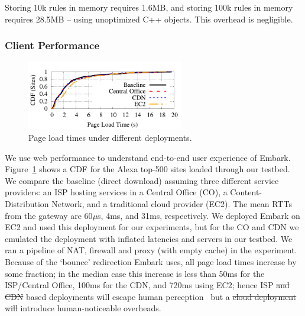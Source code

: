 \documentclass[letterpaper,twocolumn,10pt]{article}
\newcommand{\sys}{Embark\xspace} %
\providecommand{\DIFaddtex}[1]{{\protect\color{blue}\uwave{#1}}} %
\providecommand{\DIFdeltex}[1]{{\protect\color{red}\sout{#1}}}                      %
\providecommand{\DIFaddbegin}{} %
\providecommand{\DIFaddend}{} %
\providecommand{\DIFdelbegin}{} %
\providecommand{\DIFdelend}{} %
\providecommand{\DIFadd}[1]{\texorpdfstring{\DIFaddtex{#1}}{#1}} %
\providecommand{\DIFdel}[1]{\texorpdfstring{\DIFdeltex{#1}}{}} %
\begin{document}
\DIFdelbegin %
\DIFdelend \DIFaddbegin {}
\DIFaddend Storing 10k rules in memory requires 1.6MB, and storing 100k rules in memory requires 28.5MB -- using unoptimized C++ objects.
This overhead is negligible.%

\subsubsection{Client Performance}

\begin{figure}
  \vspace{-10pt}
  \hspace{-15pt}
  \centering
  \includegraphics[width=2.7in]{fig/e2e_compare}
  \caption[]{\label{fig:e2eloads} Page load times under different deployments.}
\end{figure}

We use web performance to understand end-to-end user experience of \sys.
Figure~\ref{fig:e2eloads} shows a CDF for the Alexa top-500 sites loaded through our testbed. We compare the baseline (direct download) assuming three different service providers: an ISP hosting services in a Central Office (CO), a Content-Distribution Network, and a traditional cloud provider (EC2). The mean RTTs from the gateway are 60$\mu$s, 4ms, and 31ms, respectively. We deployed \sys on EC2 and used this deployment for our experiments, but for the CO and CDN we emulated the deployment with inflated latencies and servers in our testbed. We ran a pipeline of NAT, firewall and proxy (with empty cache) in the experiment.
Because of the `bounce' redirection \sys uses, all page load times increase by some fraction; in the median case this increase is less than 50ms for the ISP/Central Office, 100ms for the CDN, and 720ms using EC2; hence ISP \DIFdelbegin \DIFdel{and CDN }\DIFdelend based deployments will escape human perception~\cite{millishumans} but a \DIFdelbegin \DIFdel{cloud deployment will }\DIFdelend \DIFaddbegin \DIFadd{CDN (or a cloud deployment) may }\DIFaddend introduce human-noticeable overheads.
\end{document}
